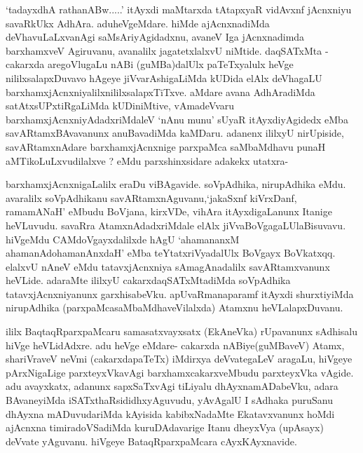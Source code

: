 \begin{artha}
`tadayxdhA rathanABw.....' itAyxdi maMtarxda tAtapxyaR vidAvxnf \-	jAcnxniyu savaRkUkx AdhAra. aduheVgeMdare. hiMde ajAcnxnadiMda deVhavuLaLxvanAgi saMsAriyAgidadxnu, avaneV Iga jAcnxnadimda barxhamxveV Agiruvanu, avanalilx jagatetxlalxvU niMtide. daqSATxMta - cakarxda aregoVlugaLu nABi (guMBa)dalUlx paTeTxyalulx heVge nililxsalapxDuvavo hAgeye jiVvarAshigaLiMda kUDida elAlx deVhagaLU barxhamxjAcnxniyalilxnililxsalapxTiTxve. aMdare avana AdhAradiMda satAtxsUPxtiRgaLiMda kUDiniMtive, vAmadeVvaru barxhamxjAcnxniyAdadxriMdaleV `nAnu munu' sUyaR itAyxdiyAgidedx eMba savARtamxBAvavanunx anuBavadiMda kaMDaru. adanenx ililxyU nirUpiside, savARtamxnAdare barxhamxjAcnxnige parxpaMca saMbaMdhavu punaH aMTikoLuLxvudilalxve ? eMdu parxshinxsidare adakekx utatxra- 

barxhamxjAcnxnigaLalilx eraDu viBAgavide. soVpAdhika, nirupAdhika eMdu. avaralilx soVpAdhikanu savARtamxnAguvanu,`jakaSxnf kiVrxDanf, ramamANaH' eMbudu BoVjana, kirxVDe, vihAra itAyxdigaLanunx Itanige heVLuvudu. savaRra AtamxnAdadxriMdale elAlx jiVvaBoVgagaLUlaBisuvavu. hiVgeMdu CAMdoVgayxdalilxde hAgU `ahamananxM ahamanAdo\s hamanAnxdaH' eMba teYtatxriVyadalUlx BoVgayx BoVkatxqq. elalxvU nAneV eMdu tatavxjAcnxniya \-sAmagAnadalilx savARtamxvanunx heVLide. adaraMte ililxyU cakarxdaqSATxMtadiMda soVpAdhika tatavxjAcnxniyanunx garxhisabeVku. apUvaRmanaparamf itAyxdi shurxtiyiMda nirupAdhika (parxpaMcasaMbaMdhaveVilalxda) Atamxnu heVLalapxDuvanu.
\end{artha}

\begin{center}


\end{center}

\begin{artha}
ililx BaqtaqRparxpaMcaru samasatxvayxsatx (EkAneVka) rUpavanunx sAdhisalu hiVge heVLidAdxre. adu heVge eMdare- cakarxda nABiye(guMBaveV) Atamx, shariVraveV neVmi (cakarxdapaTeTx) iMdirxya deVvategaLeV aragaLu, hiVgeye pArxNigaLige parxteyxVkavAgi barxhamxcakarxveMbudu parxteyxVka vAgide. adu avayxkatx, adanunx sapxSaTxvAgi tiLiyalu dhAyxnamADabeVku, adara BAvaneyiMda iSATxthaRsididhxyAguvudu, yAvAgalU I sAdhaka puruSanu dhAyxna mADuvudariMda kAyisida kabibxNadaMte Ekatavxvanunx hoMdi ajAcnxna timiradoVSadiMda kuruDAdavarige Itanu dheyxVya (upAsayx) deVvate  yAguvanu. hiVgeye BataqRparxpaMcara cAyxKAyxnavide.
\end{artha}

